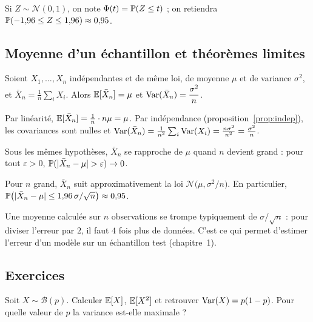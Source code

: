 Si $Z\sim\mathcal N(0,1)$, on note $\Phi(t)=\P(Z\le t)$ ; on retiendra $\P(-1{,}96\le Z\le1{,}96)\approx0{,}95$.

\subsection{Moyenne d'un échantillon et théorèmes limites}

\begin{proposition}
\label{prop:moyennevar}
Soient $X_1,\dots,X_n$ indépendantes et de même loi, de moyenne $\mu$ et de variance $\sigma^2$, et $\bar X_n=\frac1n\sum_iX_i$. Alors
$\E[\bar X_n]=\mu$ et $\Var(\bar X_n)=\dfrac{\sigma^2}{n}$.
\end{proposition}
\begin{preuve}
Par linéarité, $\E[\bar X_n]=\frac1n\cdot n\mu=\mu$. Par indépendance (proposition~\ref{prop:indep}), les covariances sont nulles et
$\Var(\bar X_n)=\frac{1}{n^2}\sum_i\Var(X_i)=\frac{n\sigma^2}{n^2}=\frac{\sigma^2}{n}$.
\end{preuve}

\begin{theoreme}
\label{thm:lgn}
Sous les mêmes hypothèses, $\bar X_n$ se rapproche de $\mu$ quand $n$ devient grand : pour tout $\varepsilon>0$, $\P(|\bar X_n-\mu|>\varepsilon)\to0$.
\end{theoreme}

\begin{theoreme}
\label{thm:tcl}
Pour $n$ grand, $\bar X_n$ suit approximativement la loi $\mathcal N\big(\mu,\sigma^2/n\big)$. En particulier,
$\P\big(|\bar X_n-\mu|\le1{,}96\,\sigma/\sqrt n\big)\approx0{,}95$.
\end{theoreme}

\begin{aretenir}
Une moyenne calculée sur $n$ observations se trompe typiquement de $\sigma/\sqrt n$ : pour diviser l'erreur par $2$, il faut $4$ fois plus de données.
C'est ce qui permet d'estimer l'erreur d'un modèle sur un échantillon test (chapitre~1).
\end{aretenir}

\subsection*{Exercices}

\begin{exercice}
\label{ex:bernoulli}
Soit $X\sim\mathcal B(p)$. Calculer $\E[X]$, $\E[X^2]$ et retrouver $\Var(X)=p(1-p)$. Pour quelle valeur de $p$ la variance est-elle maximale ?
\end{exercice}

